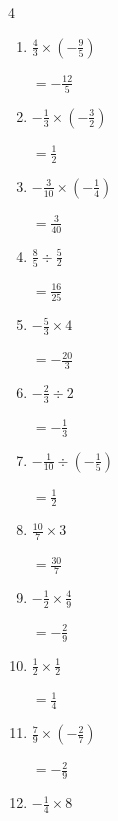 \begin{multicols}{4}
\begin{enumerate}
        $\displaystyle =-\frac{2}{9}$

  \item $\displaystyle \frac{4}{3}\times{}\left(-\frac{9}{5}\right)$

        $\displaystyle =-\frac{12}{5}$

  \item $\displaystyle -\frac{1}{3}\times{}\left(-\frac{3}{2}\right)$

        $\displaystyle =\frac{1}{2}$

  \item $\displaystyle -\frac{3}{10}\times{}\left(-\frac{1}{4}\right)$

        $\displaystyle =\frac{3}{40}$

  \item $\displaystyle \frac{8}{5}\div{}\frac{5}{2}$

        $\displaystyle =\frac{16}{25}$

  \item $\displaystyle -\frac{5}{3}\times{}4$

        $\displaystyle =-\frac{20}{3}$

\columnbreak %

\resetques

  \item $\displaystyle -\frac{2}{3}\div{}2$

        $\displaystyle =-\frac{1}{3}$

  \item $\displaystyle -\frac{1}{10}\div{}\left(-\frac{1}{5}\right)$

        $\displaystyle =\frac{1}{2}$

  \item $\displaystyle \frac{10}{7}\times{}3$

        $\displaystyle =\frac{30}{7}$

  \item $\displaystyle -\frac{1}{2}\times{}\frac{4}{9}$

        $\displaystyle =-\frac{2}{9}$

  \item $\displaystyle \frac{1}{2}\times{}\frac{1}{2}$

        $\displaystyle =\frac{1}{4}$

  \item $\displaystyle \frac{7}{9}\times{}\left(-\frac{2}{7}\right)$

        $\displaystyle =-\frac{2}{9}$

  \item $\displaystyle -\frac{1}{4}\times{}8$


\end{enumerate}
\end{multicols}
